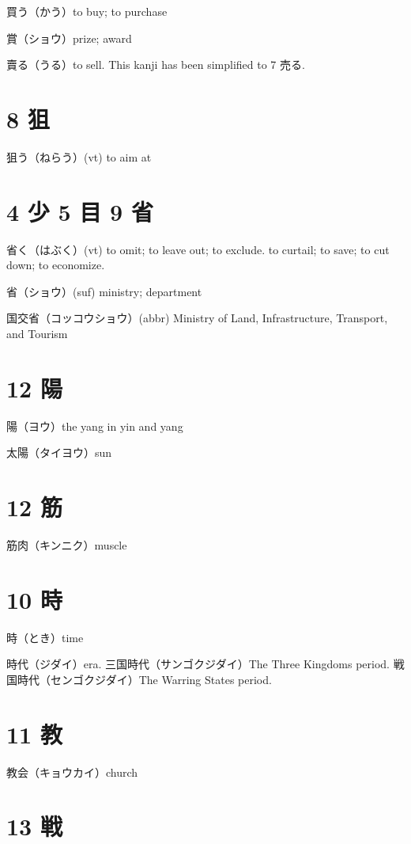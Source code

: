 買う（かう）to buy; to purchase

賞（ショウ）prize; award

賣る（うる）to sell.
This kanji has been simplified to 7 売る.

\section{8 狙}

狙う（ねらう）(vt) to aim at

\section{4 少 5 目 9 省}

省く（はぶく）(vt)
to omit; to leave out; to exclude.
to curtail; to save; to cut down; to economize.

省（ショウ）(suf) ministry; department

国交省（コッコウショウ）(abbr)
Ministry of Land, Infrastructure, Transport, and Tourism

\section{12 陽}

陽（ヨウ）the yang in yin and yang

太陽（タイヨウ）sun

\section{12 筋}

筋肉（キンニク）muscle

\section{10 時}

時（とき）time

時代（ジダイ）era.
三国時代（サンゴクジダイ）The Three Kingdoms period.
戦国時代（センゴクジダイ）The Warring States period.

\section{11 教}

教会（キョウカイ）church

\section{13 戦}

